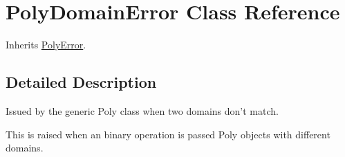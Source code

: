 \hypertarget{classpyneb_1_1utils_1_1polyutils_1_1_poly_domain_error}{}\section{Poly\+Domain\+Error Class Reference}
\label{classpyneb_1_1utils_1_1polyutils_1_1_poly_domain_error}


Inherits \hyperlink{classpyneb_1_1utils_1_1polyutils_1_1_poly_error}{Poly\+Error}.



\subsection{Detailed Description}
\begin{DoxyVerb}Issued by the generic Poly class when two domains don't match.

This is raised when an binary operation is passed Poly objects with
different domains.\end{DoxyVerb}
 